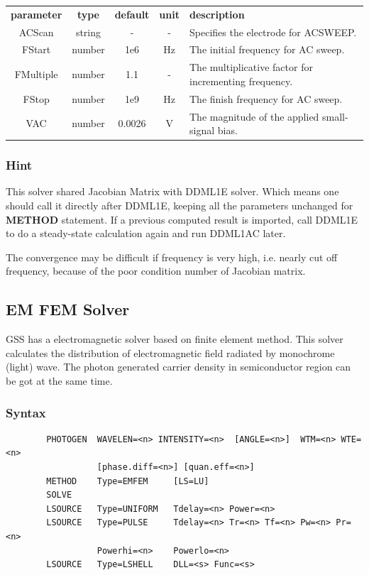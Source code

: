 \documentclass[11pt,pdftex]{article}
\begin{document}
\small \noindent\begin{longtable}{ccccp{7cm}}
\textbf{parameter}   & \textbf{type}    & \textbf{default} & \textbf{unit} & \textbf{description} \\
ACScan        & string  & -      & -    & Specifies the electrode for ACSWEEP.\\
FStart        & number  & 1e6   & $\mathrm{Hz}$    & The initial frequency for AC sweep.\\
FMultiple     & number  & 1.1   & -                & The multiplicative factor for incrementing frequency.\\
FStop         & number  & 1e9   & $\mathrm{Hz}$    & The finish frequency for AC sweep.\\
VAC           & number  & 0.0026  & $\mathrm{V}$  & The magnitude of the applied small-signal bias.\\
\end{longtable}
\normalsize

\subsubsection*{Hint}
This solver shared Jacobian Matrix with DDML1E solver. Which means
one should call it directly after DDML1E, keeping all the parameters
unchanged for \textbf{METHOD} statement. If a previous computed
result is imported, call DDML1E to do a steady-state calculation
again and run DDML1AC later.

The convergence may be difficult if frequency is very high, i.e.
nearly cut off frequency, because of the poor condition number of
Jacobian matrix.

\newpage
\subsection{EM FEM Solver}
GSS has a electromagnetic solver based on finite element method.
This solver calculates the distribution of electromagnetic field
radiated by monochrome (light) wave. The photon generated carrier
density in semiconductor region can be got at the same time.

\subsubsection*{Syntax}
\begin{verbatim}
        PHOTOGEN  WAVELEN=<n> INTENSITY=<n>  [ANGLE=<n>]  WTM=<n> WTE=<n>
                  [phase.diff=<n>] [quan.eff=<n>]
        METHOD    Type=EMFEM     [LS=LU]
        SOLVE
        LSOURCE   Type=UNIFORM   Tdelay=<n> Power=<n>
        LSOURCE   Type=PULSE     Tdelay=<n> Tr=<n> Tf=<n> Pw=<n> Pr=<n>
                  Powerhi=<n>    Powerlo=<n>
        LSOURCE   Type=LSHELL    DLL=<s> Func=<s>
\end{verbatim}
\end{document}
